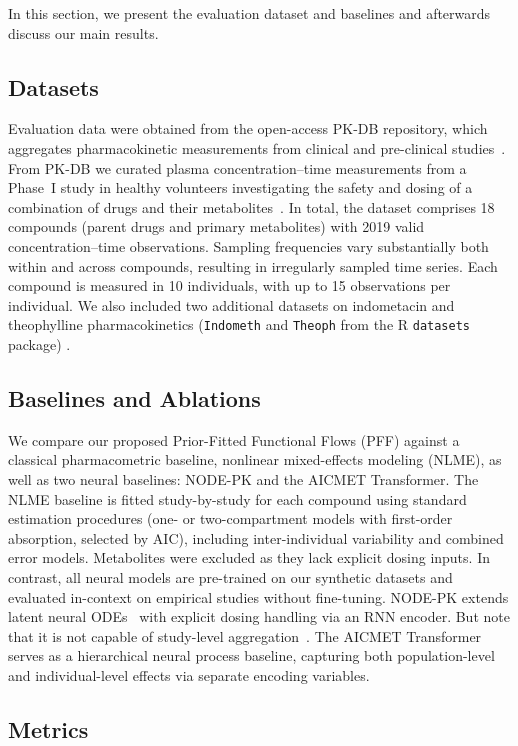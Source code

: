 
In this section, we present the evaluation dataset and baselines and afterwards discuss our main results.
\subsection{Datasets}
\label{sec:data}
Evaluation data were obtained from the open-access PK-DB repository, which aggregates pharmacokinetic measurements from clinical and pre-clinical studies~\citep{grzegorzewski2021pkdb}.
%
From PK-DB we curated plasma concentration--time measurements from a Phase~I study in healthy volunteers investigating the safety and dosing of a combination of drugs and their metabolites~\citep{lenuzza2016safety}.
%
In total, the dataset comprises 18 compounds (parent drugs and primary metabolites) with 2019 valid concentration--time observations.
%
Sampling frequencies vary substantially both within and across compounds, resulting in irregularly sampled time series.
%
Each compound is measured in 10 individuals, with up to 15 observations per individual. 
We also included two additional datasets on indometacin and theophylline pharmacokinetics (\texttt{Indometh} and \texttt{Theoph} from the R \texttt{datasets} package) \citep{Rsoftware}.

\subsection{Baselines and Ablations}
\label{sec:baselines}

We compare our proposed Prior-Fitted Functional Flows (PFF) against a classical pharmacometric baseline, nonlinear mixed-effects modeling (NLME), as well as two neural baselines: NODE-PK and the AICMET Transformer. The NLME baseline is fitted study-by-study for each compound using standard estimation procedures (one- or two-compartment models with first-order absorption, selected by AIC), including inter-individual variability and combined error models. Metabolites were excluded as they lack explicit dosing inputs. In contrast, all neural models are pre-trained on our synthetic datasets and evaluated in-context on empirical studies without fine-tuning. NODE-PK extends latent neural ODEs~\citep{rubanova2019latent} with explicit dosing handling via an RNN encoder. But note that it is not capable of study-level aggregation~\citep{lu2021deep}. The AICMET Transformer~\citep{marin2025amortized} serves as a hierarchical neural process baseline, capturing both population-level and individual-level effects via separate encoding variables. 
\subsection{Metrics}

